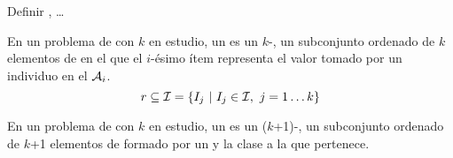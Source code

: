 \ABIERTO
Definir \atributos, \clases\ldots

\begin{Definition}[\Registro]
   En un problema de \Clasificacion con $k$ \atributos en estudio, un \registro \reg es un $k$-\itemset, un subconjunto ordenado de $k$ elementos de \I en el que el $i$-ésimo ítem representa el valor tomado por un individuo en el \atributo $\A_i$.
   \begin{equation}\label{eq:def-registro}
     \reg \subseteq \I = \left\{I_j\ | \ I_j \in \I,\ j = 1 \ldots k\right\}
   \end{equation}
\label{def:registro}
\end{Definition}

\begin{Definition}[\RegClas]
   En un problema de \Clasificacion con $k$ \atributos en estudio, un \RegClas es un ($k$+1)-\itemset, un subconjunto ordenado de $k$+1 elementos de \I formado por un \registro y la clase a la que pertenece.
\label{def:registro-clasificado}
\end{Definition}


